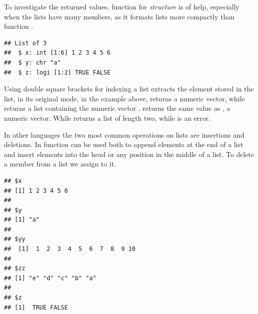 \documentclass[krantz2]{krantz}\usepackage{knitr}%
\begin{document}
To investigate the returned values, function  for \emph{structure} is of help, especially when the lists have many members, as it formats lists more compactly than function .

\begin{knitrout}\footnotesize
{}\color{fgcolor}\begin{kframe}
\begin{alltt}
\end{alltt}
\begin{verbatim}
## List of 3
##  $ x: int [1:6] 1 2 3 4 5 6
##  $ y: chr "a"
##  $ z: logi [1:2] TRUE FALSE
\end{verbatim}
\end{kframe}
\end{knitrout}

Using\qRoperator{[[]]} double square brackets for indexing a list extracts the element stored in the list, in its original mode, in the example above,  returns a numeric vector, while  returns a list containing the numeric vector .  returns the same value as , a numeric vector. While  returns a list of length two, while  is an error.

In other languages the two most common operations on lists are insertions and deletions. In \Rlang function  can be used both to append elements at the end of a list and insert elements into the head or any position in the middle of a list. To delete a member from a list we assign  to it.

\begin{knitrout}\footnotesize
{}\color{fgcolor}\begin{kframe}
\begin{alltt}
 \hlkwb{<-}  \hlstd{(} \hlstd{=} \hlopt{:}\hlstd{,}  \hlstd{= letters[}\hlopt{:}\hlstd{]),} \hlstd{)}
\end{alltt}
\begin{verbatim}
## $x
## [1] 1 2 3 4 5 6
## 
## $y
## [1] "a"
## 
## $yy
##  [1]  1  2  3  4  5  6  7  8  9 10
## 
## $zz
## [1] "e" "d" "c" "b" "a"
## 
## $z
## [1]  TRUE FALSE
\end{verbatim}
\end{kframe}
\end{knitrout}
\end{document}
